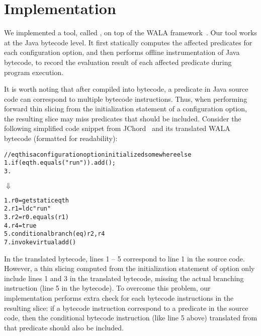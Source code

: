 \section{Implementation}
\label{sec:implementation}

We implemented a tool, called \ourtool, on top of the WALA
framework~\cite{wala}. Our tool works at the Java bytecode level.
It first statically computes the affected predicates
for each configuration option, and then performs offline instrumentation
of Java bytecode, to record the evaluation result of each affected
predicate during program execution. 

It is worth noting that after compiled into bytecode,
a predicate in Java source code can correspond to multiple bytecode
instructions. Thus, when performing forward thin slicing from
the initialization statement of a configuration option,
the resulting slice may miss predicates that should be included.
Consider the following simplified code snippet from JChord~\cite{jchord}
and its translated WALA bytecode (formatted for readability): 


\begin{CodeOut}
\begin{alltt}
   // eqth is a configuration option initialized somewhere else
1. if (eqth.equals("run")) .   add();
3. \ttrcb
\end{alltt}
\end{CodeOut}
\vspace{-2mm}
\hspace{20mm}$\Downarrow$ 
\begin{CodeOut}
\begin{alltt}
1. r0 = getstatic eqth
2. r1 = ldc "run"
3. r2 = r0.equals(r1)
4. r4 = true
5. conditional branch(eq) r2, r4
7. invokevirtual add() 
\end{alltt}
\end{CodeOut}

In the translated bytecode, lines 1 -- 5 correspond to line 1 in the
source code. However, a thin slicing computed from the
initialization statement of option  only include lines 1 and 3
in the translated bytecode, missing the actual branching
instruction (line 5 in the bytecode).
To overcome this problem, our implementation performs extra check
for each bytecode instructions in the resulting slice:
if a bytecode instruction 
correspond to a predicate in the source code, then the
conditional bytecode instruction (like line 5 above) translated from that predicate
should also be included.

